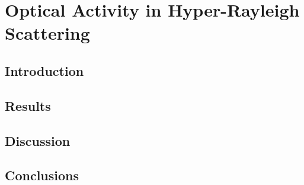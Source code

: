 \chapter{Optical Activity in Hyper-Rayleigh Scattering}\label{sec:results:HRS}
\section{Introduction}
\section{Results}
\section{Discussion}
\section{Conclusions}